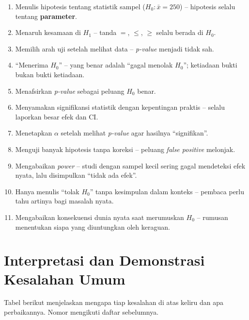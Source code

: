 \documentclass[
  indonesian,
  letterpaper,
]{book}
\providecommand{\tightlist}{%
  \setlength{\itemsep}{0pt}\setlength{\parskip}{0pt}}
\begin{document}
\begin{enumerate}
\def\labelenumi{\arabic{enumi}.}
\tightlist
\item
  Menulis hipotesis tentang statistik sampel (\(H_0: \bar{x} = 250\)) --
  hipotesis selalu tentang \textbf{parameter}.
\item
  Menaruh kesamaan di \(H_1\) -- tanda \(=\), \(\leq\), \(\geq\) selalu
  berada di \(H_0\).
\item
  Memilih arah uji setelah melihat data -- \emph{p-value} menjadi tidak
  sah.
\item
  ``Menerima \(H_0\)'' -- yang benar adalah ``gagal menolak \(H_0\)'';
  ketiadaan bukti bukan bukti ketiadaan.
\item
  Menafsirkan \emph{p-value} sebagai peluang \(H_0\) benar.
\item
  Menyamakan signifikansi statistik dengan kepentingan praktis -- selalu
  laporkan besar efek dan CI.
\item
  Menetapkan \(\alpha\) setelah melihat \emph{p-value} agar hasilnya
  ``signifikan''.
\item
  Menguji banyak hipotesis tanpa koreksi -- peluang \emph{false
  positive} melonjak.
\item
  Mengabaikan \emph{power} -- studi dengan sampel kecil sering gagal
  mendeteksi efek nyata, lalu disimpulkan ``tidak ada efek''.
\item
  Hanya menulis ``tolak \(H_0\)'' tanpa kesimpulan dalam konteks --
  pembaca perlu tahu artinya bagi masalah nyata.
\item
  Mengabaikan konsekuensi dunia nyata saat merumuskan \(H_0\) -- rumusan
  menentukan siapa yang diuntungkan oleh keraguan.
\end{enumerate}

\section{Interpretasi dan Demonstrasi Kesalahan
Umum}\label{interpretasi-dan-demonstrasi-kesalahan-umum}

Tabel berikut menjelaskan mengapa tiap kesalahan di atas keliru dan apa
perbaikannya. Nomor mengikuti daftar sebelumnya.
\end{document}
